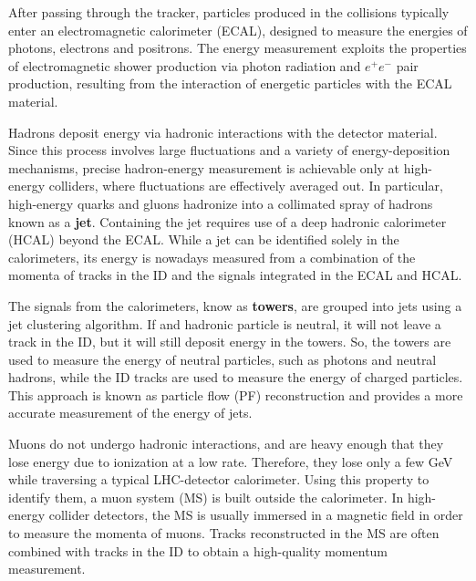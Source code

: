 After passing through the tracker, particles produced in the collisions typically enter an electromagnetic calorimeter (ECAL), designed to measure the energies of photons, electrons and positrons. The energy measurement exploits the properties of electromagnetic shower production via photon radiation and $e^{+} e^{-}$ pair production, resulting from the interaction of energetic particles with the ECAL material.

Hadrons deposit energy via hadronic interactions with the detector material. Since this process involves large fluctuations and a variety of energy-deposition mechanisms, precise hadron-energy measurement is achievable only at high-energy colliders, where fluctuations are effectively averaged out. In particular, high-energy quarks and gluons hadronize into a collimated spray of hadrons known as a \textbf{jet}. Containing the jet requires use of a deep hadronic calorimeter (HCAL) beyond the ECAL. While a jet can be identified solely in the calorimeters, its energy is nowadays measured from a combination of the momenta of tracks in the ID and the signals integrated in the ECAL and HCAL. 

The signals from the calorimeters, know as \textbf{towers}, are grouped into jets using a jet clustering algorithm. If and hadronic particle is neutral, it will not leave a track in the ID, but it will still deposit energy in the towers. So, the towers are used to measure the energy of neutral particles, such as photons and neutral hadrons, while the ID tracks are used to measure the energy of charged particles. This approach is known as particle flow (PF) reconstruction and provides a more accurate measurement of the energy of jets. 

Muons do not undergo hadronic interactions, and are heavy enough that they lose energy due to ionization at a low rate. Therefore, they lose only a few GeV while traversing a typical LHC-detector calorimeter. Using this property to identify them, a muon system (MS) is built outside the calorimeter. In high-energy collider detectors, the MS is usually immersed in a magnetic field in order to measure the momenta of muons. Tracks reconstructed in the MS are often combined with tracks in the ID to obtain a high-quality momentum measurement.

